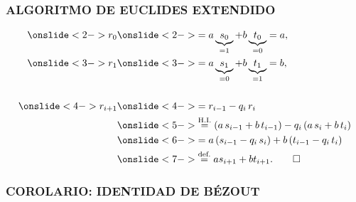 \begin{frame}
  \frametitle{ALGORITMO DE EUCLIDES EXTENDIDO}

  \begin{align*}
    \onslide<2->{r_0} & \onslide<2->{= a \underbrace{s_0}_{= 1} + b \underbrace{t_0}_{= 0} = a,} \\
    \onslide<3->{r_1} & \onslide<3->{= a \underbrace{s_1}_{= 0} + b \underbrace{t_1}_{= 1} = b,} \\
    \\
    \onslide<4->{r_{i+1}} & \onslide<4->{= r_{i-1} - q_i\,r_i} \\
                      & \onslide<5->{\stackrel{\text{H.I.}}{=} (a\,s_{i-1} + b\,t_{i-1}) - q_i\,(a\,s_i + b\,t_i)} \\
                      & \onslide<6->{= a\,(s_{i-1} - q_i\,s_i) + b\,(t_{i-1} - q_i\,t_i)} \\
                      & \onslide<7->{\stackrel{\text{def.}}{=} a s_{i+1} + b t_{i+1}. \qed}
  \end{align*}

\end{frame}

\begin{frame}
  \frametitle{COROLARIO: IDENTIDAD DE BÉZOUT}





\end{frame}

